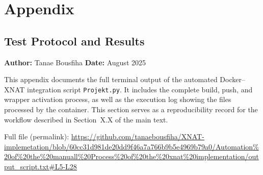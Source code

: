 
    
\appendix
\chapter{Appendix}
\section{Test Protocol and Results}
\label{app:test}

\noindent\textbf{Author:} Tanae Bousfiha  
\noindent\textbf{Date:} August 2025  

\noindent This appendix documents the full terminal output of the automated Docker–XNAT integration script
\texttt{Projekt.py}.  
It includes the complete build, push, and wrapper activation process, as well as the execution log showing the files processed by the container.  
This section serves as a reproducibility record for the workflow described in Section~X.X of the main text.








\noindent Full file (permalink):  
\url{https://github.com/tanaebousfiha/XNAT-implemetation/blob/60cc31d981de20dd9f46a7a766b9b5e4969b79a0/Automation%20of%20the%20manuall%20Process%20of%20the%20xnat%20implementation/output_script.txt#L5-L28}
